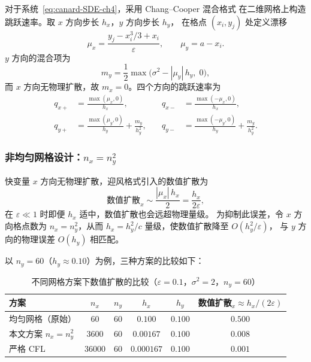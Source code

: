 对于系统~\eqref{eq:canard-SDE-ch4}，采用 Chang--Cooper 混合格式
在二维网格上构造跳跃速率。取 $x$ 方向步长 $h_x$，$y$ 方向步长 $h_y$，
在格点 $(x_i, y_j)$ 处定义漂移
\[
\mu_x = \frac{y_j - x_i^3/3 + x_i}{\varepsilon},\qquad
\mu_y = a - x_i.
\]
$y$ 方向的混合项为
\begin{equation}\label{eq:m-y}
	m_y = \frac{1}{2}\max\!\bigl(\sigma^2 - |\mu_y|\,h_y,\;0\bigr),
\end{equation}
而 $x$ 方向无物理扩散，故 $m_x = 0$。四个方向的跳跃速率为
\begin{equation}\label{eq:jump-rates}
	\begin{aligned}
		q_{x+} &= \frac{\max(\mu_x,0)}{h_x},&\quad
		q_{x-} &= \frac{\max(-\mu_x,0)}{h_x},\\
		q_{y+} &= \frac{\max(\mu_y,0)}{h_y} + \frac{m_y}{h_y^2},&\quad
		q_{y-} &= \frac{\max(-\mu_y,0)}{h_y} + \frac{m_y}{h_y^2}.
	\end{aligned}
\end{equation}

\subsubsection{非均匀网格设计：$n_x = n_y^2$}

快变量 $x$ 方向无物理扩散，迎风格式引入的数值扩散为
\[
\text{数值扩散}_x \sim \frac{|\mu_x|\,h_x}{2}
= \frac{h_x}{2\varepsilon},
\]
在 $\varepsilon \ll 1$ 时即便 $h_x$ 适中，数值扩散也会远超物理量级。
为抑制此误差，令 $x$ 方向格点数为 $n_x = n_y^2$，从而
$h_x = h_y^2/c$ 量级，使数值扩散降至 $O(h_y^2/\varepsilon)$，
与 $y$ 方向的物理误差 $O(h_y)$ 相匹配。

以 $n_y = 60$（$h_y \approx 0.10$）为例，三种方案的比较如下：
\begin{table}[!htbp]
	\centering
	\caption{不同网格方案下数值扩散的比较（$\varepsilon=0.1$，$\sigma^2=2$，$n_y=60$）}
	\label{tab:grid-schemes}
	\begin{tabular}{lccccc}
		\toprule
		方案 & $n_x$ & $n_y$ & $h_x$ & $h_y$ & 数值扩散$_x \approx h_x/(2\varepsilon)$ \\
		\midrule
		均匀网格（原始） & 60 & 60 & $0.100$ & $0.100$ & $0.500$ \\
		本文方案 $n_x=n_y^2$ & 3600 & 60 & $0.00167$ & $0.100$ & $0.008$ \\
		严格 CFL & 36000 & 60 & $0.000167$ & $0.100$ & $0.001$ \\
		\bottomrule
	\end{tabular}
\end{table}

